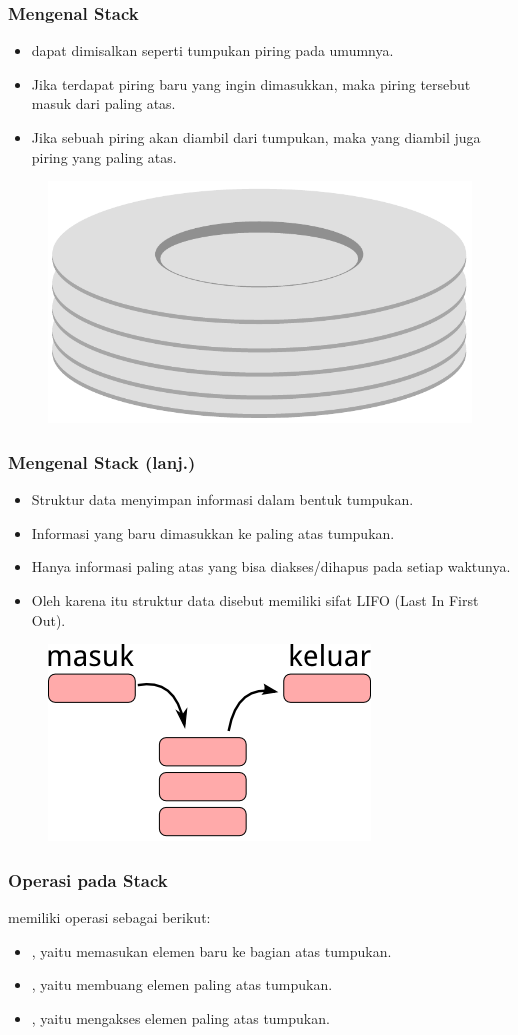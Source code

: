 \begin{frame}
\frametitle{Mengenal Stack}
\begin{itemize}
  \item {} dapat dimisalkan seperti tumpukan piring pada umumnya.
  \item Jika terdapat piring baru yang ingin dimasukkan, maka piring tersebut masuk dari paling atas.
  \item Jika sebuah piring akan diambil dari tumpukan, maka yang diambil juga piring yang paling atas.
\end{itemize}

\begin{figure}
  \centering
  \includegraphics[width=4 cm]{asset/plates-stack.pdf}
\end{figure}
\end{frame}

\begin{frame}
\frametitle{Mengenal Stack (lanj.)}
\begin{itemize}
  \item Struktur data  menyimpan informasi dalam bentuk tumpukan.
  \item Informasi yang baru dimasukkan ke paling atas tumpukan.
  \item Hanya informasi paling atas yang bisa diakses/dihapus pada setiap waktunya.
  \item Oleh karena itu struktur data  disebut memiliki sifat LIFO (Last In First Out).
\end{itemize}
\begin{figure}
  \centering
  \includegraphics[width=4 cm]{asset/stack.png}
\end{figure}
\end{frame}

\begin{frame}
\frametitle{Operasi pada Stack}

 memiliki operasi sebagai berikut:
\begin{itemize}
  \item {}, yaitu memasukan elemen baru ke bagian atas tumpukan.
  \item {}, yaitu membuang elemen paling atas tumpukan.
  \item {}, yaitu mengakses elemen paling atas tumpukan.
\end{itemize}
\end{frame}

